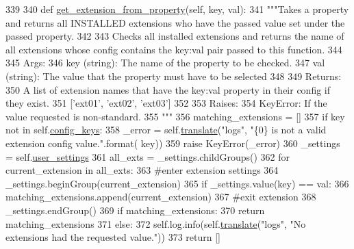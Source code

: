 \begin{DoxyCode}
339 
340     \textcolor{keyword}{def }\hyperlink{classcommotion__client_1_1utils_1_1extension__manager_1_1ExtensionManager_ac5a486ac7518727f2fab847f989cdfd9}{get\_extension\_from\_property}(self, key, val):
341         \textcolor{stringliteral}{"""Takes a property and returns all INSTALLED extensions who have the passed value set under the
       passed property.}
342 \textcolor{stringliteral}{}
343 \textcolor{stringliteral}{        Checks all installed extensions and returns the name of all extensions whose config contains the
       key:val pair passed to this function.}
344 \textcolor{stringliteral}{}
345 \textcolor{stringliteral}{        Args:}
346 \textcolor{stringliteral}{          key (string): The name of the property to be checked.}
347 \textcolor{stringliteral}{          val (string): The value that the property must have to be selected}
348 \textcolor{stringliteral}{}
349 \textcolor{stringliteral}{        Returns:}
350 \textcolor{stringliteral}{          A list of extension names that have the key:val property in their config if they exist.}
351 \textcolor{stringliteral}{            ['ext01', 'ext02', 'ext03']}
352 \textcolor{stringliteral}{}
353 \textcolor{stringliteral}{        Raises:}
354 \textcolor{stringliteral}{          KeyError: If the value requested is non-standard.}
355 \textcolor{stringliteral}{        """}
356         matching\_extensions = []
357         \textcolor{keywordflow}{if} key \textcolor{keywordflow}{not} \textcolor{keywordflow}{in} self.\hyperlink{classcommotion__client_1_1utils_1_1extension__manager_1_1ExtensionManager_a72f3a3497a4593880a56e3952e674b13}{config\_keys}:
358             \_error = self.\hyperlink{classcommotion__client_1_1utils_1_1extension__manager_1_1ExtensionManager_a2cfd032ca383c3fd6f0f52b99b6dd67c}{translate}(\textcolor{stringliteral}{"logs"}, \textcolor{stringliteral}{"\{0\} is not a valid extension config value."}.format(
      key))
359             \textcolor{keywordflow}{raise} KeyError(\_error)
360         \_settings = self.\hyperlink{classcommotion__client_1_1utils_1_1extension__manager_1_1ExtensionManager_a0fa8b2be1171ded73629a01c50472d34}{user\_settings}
361         all\_exts = \_settings.childGroups()
362         \textcolor{keywordflow}{for} current\_extension \textcolor{keywordflow}{in} all\_exts:
363             \textcolor{comment}{#enter extension settings}
364             \_settings.beginGroup(current\_extension)
365             \textcolor{keywordflow}{if} \_settings.value(key) == val:
366                 matching\_extensions.append(current\_extension)
367             \textcolor{comment}{#exit extension}
368             \_settings.endGroup()
369         \textcolor{keywordflow}{if} matching\_extensions:
370             \textcolor{keywordflow}{return} matching\_extensions
371         \textcolor{keywordflow}{else}:
372             self.log.info(self.\hyperlink{classcommotion__client_1_1utils_1_1extension__manager_1_1ExtensionManager_a2cfd032ca383c3fd6f0f52b99b6dd67c}{translate}(\textcolor{stringliteral}{"logs"}, \textcolor{stringliteral}{"No extensions had the requested value."}))
373             \textcolor{keywordflow}{return} []

\end{DoxyCode}
